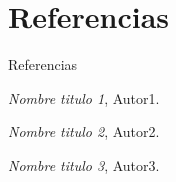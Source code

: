 \documentclass{beamer}
\begin{document}

\section{Referencias}
\begin{frame}[shrink]{Referencias}
  \begin{thebibliography}{10}
    

  \emph{Nombre titulo 1}, Autor1.
  
  \emph{Nombre titulo 2}, Autor2.
    
  \emph{Nombre titulo 3}, Autor3.

  \end{thebibliography}
\end{frame}
\end{document}
